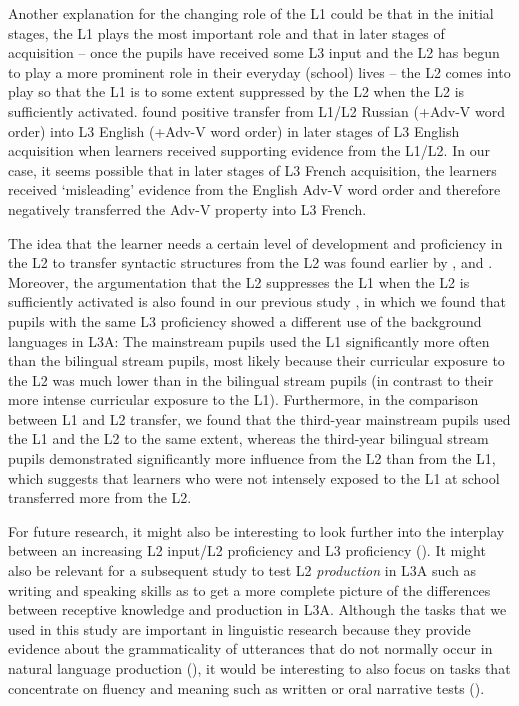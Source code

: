 \documentclass[output=paper,modfonts,nonflat, newtxmath]{langsci/langscibook}
\begin{document}
  Another explanation for the changing role of the L1 could be that in the initial stages, the L1 plays the most important role and that in later stages of acquisition – once the pupils have received some L3 input and the L2 has begun to play a more prominent role in their everyday (school) lives – the L2 comes into play so that the L1 is to some extent suppressed by the L2 when the L2 is sufficiently activated. \citet{WestergaardEtAl2016} found positive transfer from L1/L2 Russian (+Adv-V word order) into L3 English (+Adv-V word order) in later stages of L3 English acquisition when learners received supporting evidence from the L1/L2. In our case, it seems possible that in later stages of L3 French acquisition, the learners received ‘misleading’ evidence from the English Adv-V word order and therefore negatively transferred the Adv-V property into L3 French.

The idea that the learner needs a certain level of development and proficiency in the L2 to transfer syntactic structures from the L2 was found earlier by \citet{BardelFalk2007}, \citet{SánchezBardel2017} and . Moreover, the argumentation that the L2 suppresses the L1 when the L2 is sufficiently activated is also found in our previous study \citep{StadtEtAl2016}, in which we found that pupils with the same L3 proficiency showed a different use of the background languages in L3A: The mainstream pupils used the L1 significantly more often than the bilingual stream pupils, most likely because their curricular exposure to the L2 was much lower than in the bilingual stream pupils (in contrast to their more intense curricular exposure to the L1). Furthermore, in the comparison between L1 and L2 transfer, we found that the third-year mainstream pupils used the L1 and the L2 to the same extent, whereas the third-year bilingual stream pupils demonstrated significantly more influence from the L2 than from the L1, which suggests that learners who were not intensely exposed to the L1 at school transferred more from the L2.

For future research, it might also be interesting to look further into the interplay between an increasing L2 input/L2 proficiency and L3 proficiency (\citealt{BardelLindqvist2007, SánchezBardel2017}). It might also be relevant for a subsequent study to test L2 \textit{production} in L3A such as writing and speaking skills as to get a more complete picture of the differences between receptive knowledge and production in L3A. Although the tasks that we used in this study are important in linguistic research because they provide evidence about the grammaticality of utterances that do not normally occur in natural language production (\citealt{SchützeSprouse2014}), it would be interesting to also focus on tasks that concentrate on fluency and meaning such as written or oral narrative tests (\citealt{EllisR2005, EllisR2009}).
\end{document}
